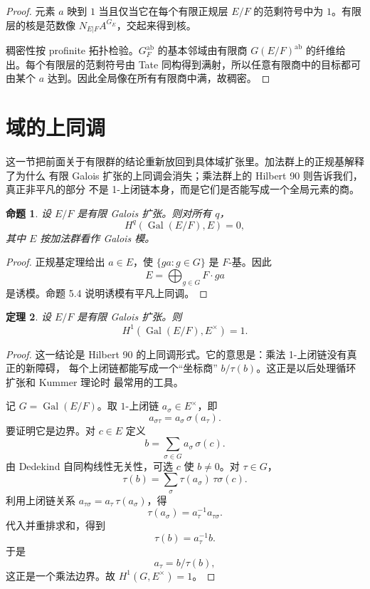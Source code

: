 \documentclass[11pt,a4paper,openany]{ctexbook}
\numberwithin{equation}{chapter}
\theoremstyle{plain}
\newtheorem{theorem}{定理}[chapter]
\newtheorem{proposition}[theorem]{命题}
\theoremstyle{definition}
\theoremstyle{remark}
\begin{document}
\begin{proof}
元素 $a$ 映到 $1$ 当且仅当它在每个有限正规层 $E/F$ 的范剩符号中为 $1$。有限层的核是范数像 $N_{E|F}A^{G_E}$，交起来得到核。

稠密性按 profinite 拓扑检验。$G_F^{\operatorname{ab}}$ 的基本邻域由有限商 $G(E/F)^{\operatorname{ab}}$ 的纤维给出。每个有限层的范剩符号由 Tate 同构得到满射，所以任意有限商中的目标都可由某个 $a$ 达到。因此全局像在所有有限商中满，故稠密。
\end{proof}

\section{域的上同调}

这一节把前面关于有限群的结论重新放回到具体域扩张里。加法群上的正规基解释了为什么
有限 Galois 扩张的上同调会消失；乘法群上的 Hilbert 90 则告诉我们，真正非平凡的部分
不是 1-上闭链本身，而是它们是否能写成一个全局元素的商。

\begin{proposition}
设 $E/F$ 是有限 Galois 扩张。则对所有 $q$，
\[
 H^q(\operatorname{Gal}(E/F),E)=0,
\]
其中 $E$ 按加法群看作 Galois 模。
\end{proposition}

\begin{proof}
正规基定理给出 $a\in E$，使 $\{ga:g\in G\}$ 是 $F$-基。因此
\[
 E=\bigoplus_{g\in G}F\cdot ga
\]
是诱模。命题 5.4 说明诱模有平凡上同调。
\end{proof}

\begin{theorem}
设 $E/F$ 是有限 Galois 扩张。则
\[
 H^1(\operatorname{Gal}(E/F),E^\times)=1.
\]
\end{theorem}

\begin{proof}
这一结论是 Hilbert 90 的上同调形式。它的意思是：乘法 1-上闭链没有真正的新障碍，
每个上闭链都能写成一个“坐标商” $b/\tau(b)$。这正是以后处理循环扩张和 Kummer 理论时
最常用的工具。

记 $G=\operatorname{Gal}(E/F)$。取 $1$-上闭链 $a_\sigma\in E^\times$，即
\[
 a_{\sigma\tau}=a_\sigma\,\sigma(a_\tau).
\]
要证明它是边界。对 $c\in E$ 定义
\[
 b=\sum_{\sigma\in G}a_\sigma\,\sigma(c).
\]
由 Dedekind 自同构线性无关性，可选 $c$ 使 $b\ne0$。对 $\tau\in G$，
\[
 \tau(b)=\sum_\sigma \tau(a_\sigma)\,\tau\sigma(c).
\]
利用上闭链关系 $a_{\tau\sigma}=a_\tau\,\tau(a_\sigma)$，得
\[
 \tau(a_\sigma)=a_\tau^{-1}a_{\tau\sigma}.
\]
代入并重排求和，得到
\[
 \tau(b)=a_\tau^{-1}b.
\]
于是
\[
 a_\tau=b/\tau(b),
\]
这正是一个乘法边界。故 $H^1(G,E^\times)=1$。
\end{proof}
\end{document}
